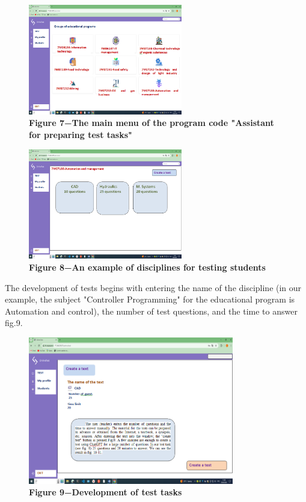 \begin{figure}[H]
	\centering
	\includegraphics[width=0.6\textwidth]{assets/132}
	\caption*{\bfseries Figure 7−The main menu of the program code "Assistant for
	preparing test tasks"}
\end{figure}



\begin{figure}[H]
	\centering
	\includegraphics[width=0.6\textwidth]{assets/133}
	\caption*{\bfseries Figure 8−An example of disciplines for testing students}
\end{figure}

\begin{multicols}{2}
The development of tests begins with entering the name of the discipline
(in our example, the subject "Controller Programming" for the
educational program is Automation and control), the number of test
questions, and the time to answer fig.9.
\end{multicols}

\begin{figure}[H]
	\centering
	\includegraphics[width=0.8\textwidth]{assets/134}
	\caption*{\bfseries Figure 9−Development of test tasks}
\end{figure}

